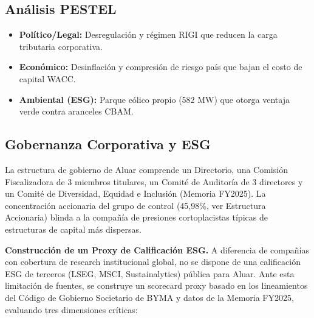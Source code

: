 \documentclass[10pt,a4paper]{article}
\begin{document}
\subsection{Análisis PESTEL}
\begin{itemize}
    \item \textbf{Político/Legal:} Desregulación y régimen RIGI que reducen la carga tributaria corporativa.
    \item \textbf{Económico:} Desinflación y compresión de riesgo país que bajan el costo de capital WACC.
    \item \textbf{Ambiental (ESG):} Parque eólico propio (582 MW) que otorga ventaja verde contra aranceles CBAM.
\end{itemize}

\subsection{Gobernanza Corporativa y ESG}
La estructura de gobierno de Aluar comprende un Directorio, una Comisión Fiscalizadora de 3 miembros titulares, un Comité de Auditoría de 3 directores y un Comité de Diversidad, Equidad e Inclusión (Memoria FY2025). La concentración accionaria del grupo de control (45,98\%, ver Estructura Accionaria) blinda a la compañía de presiones cortoplacistas típicas de estructuras de capital más dispersas.

\textbf{Construcción de un Proxy de Calificación ESG.} A diferencia de compañías con cobertura de research institucional global, no se dispone de una calificación ESG de terceros (LSEG, MSCI, Sustainalytics) pública para Aluar. Ante esta limitación de fuentes, se construye un scorecard proxy basado en los lineamientos del Código de Gobierno Societario de BYMA y datos de la Memoria FY2025, evaluando tres dimensiones críticas:
\end{document}
